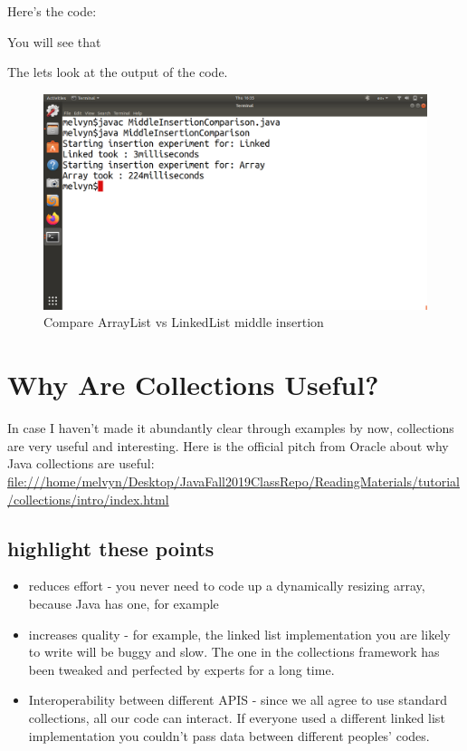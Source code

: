 \documentclass[10pt]{article}
\begin{document}
Here's the code:




You will see that 

The lets look at the output of the code.

\begin{figure}[h]
  \centering
    \includegraphics[width=\textwidth]{middleInsertionComparison.png}
  \caption{Compare ArrayList vs LinkedList middle insertion}
\end{figure}


\section{Why Are Collections Useful?}
In case I haven't made it abundantly clear through examples by now, collections are very useful and interesting. Here is the official pitch from Oracle about why Java collections are useful:
\url{file:///home/melvyn/Desktop/JavaFall2019ClassRepo/ReadingMaterials/tutorial/collections/intro/index.html}

\subsection{highlight these points}
\begin{itemize}
\item reduces effort - you never need to code up a dynamically resizing array, because Java has one, for example
\item increases quality - for example, the linked list implementation you are likely to write will be buggy and slow. The one in the collections framework has been tweaked and perfected by experts for a long time.
\item Interoperability between different APIS - since we all agree to use standard collections, all our code can interact. If everyone used a different linked list implementation you couldn't pass data between different peoples' codes.
\end{itemize}
\end{document}
